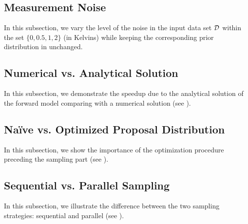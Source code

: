 \subsection{Measurement Noise}
In this subsection, we vary the level of the noise in the input data set $\mathcal{D}$ within the set $\{ 0, 0.5, 1, 2 \}$ (in Kelvins) while keeping the corresponding prior distribution in  unchanged.

\subsection{Numerical vs. Analytical Solution}
In this subsection, we demonstrate the speedup due to the analytical solution of the forward model comparing with a numerical solution (see ).

\subsection{Na\"{i}ve vs. Optimized Proposal Distribution}
In this subsection, we show the importance of the optimization procedure preceding the sampling part (see ).

\subsection{Sequential vs. Parallel Sampling}
In this subsection, we illustrate the difference between the two sampling strategies: sequential and parallel (see ).
